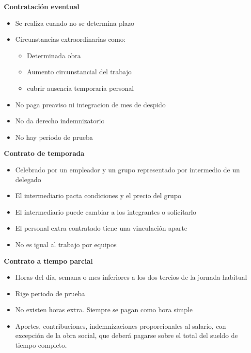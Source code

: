 \documentclass{article}
\begin{document}
\textbf{Contratación eventual}
\begin{itemize}
	\item Se realiza cuando no se determina plazo
	\item Circunstancias extraordinarias como:
	\begin{itemize}
		\item Determinada obra
		\item Aumento circunstancial del trabajo
	    \item cubrir ausencia temporaria personal
	\end{itemize}
\item No paga preaviso ni integracion de mes de despido
\item No da derecho indemnizatorio
\item No hay periodo de prueba
\end{itemize}

\textbf{Contrato de temporada}
\begin{itemize}
	\item Celebrado por un empleador y un grupo representado por intermedio de un delegado
	\item El intermediario pacta condiciones y el precio del grupo
	\item El intermediario puede cambiar a los integrantes o solicitarlo 
	\item El personal extra contratado tiene una vinculación aparte
	\item No es igual al trabajo por equipos
\end{itemize}

\textbf{Contrato a tiempo parcial}
\begin{itemize}
	\item Horas del día, semana o mes inferiores a los dos tercios de la jornada habitual
	\item Rige periodo de prueba
	\item No existen horas extra. Siempre se pagan como hora simple
	\item Aportes, contribuciones, indemnizaciones proporcionales al salario, con excepción de la obra social, que deberá pagarse sobre el total del sueldo de tiempo completo.
\end{itemize}



\end{document}
